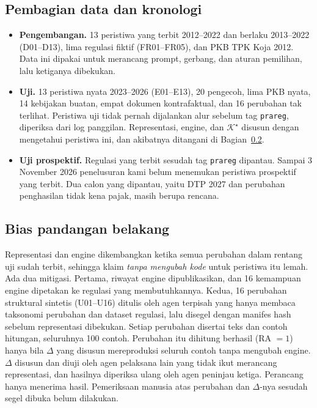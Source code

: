 \documentclass[conference]{IEEEtran}
\makeatletter
\DeclareRobustCommand{\en}[1]{{\usefont{\f@encoding}{\f@family}{\f@series}{it}#1\/}}
\newcommand{\K}{\mathcal{K}}
\newcommand{\emas}{\star}
\makeatother
\begin{document}
\subsection{Pembagian data dan kronologi}
\label{subsec:pembagian}
\begin{itemize}[leftmargin=*,nosep]
  \item \textbf{Pengembangan.} 13 peristiwa yang terbit 2012--2022 dan berlaku 2013--2022 (D01--D13), lima regulasi fiktif (FR01--FR05), dan PKB TPK Koja 2012. Data ini dipakai untuk merancang \en{prompt}, gerbang, dan aturan pemilihan, lalu ketiganya dibekukan.
  \item \textbf{Uji.} 13 peristiwa nyata 2023--2026 (E01--E13), 20 pengecoh, lima PKB nyata, 14 kebijakan buatan, empat dokumen kontrafaktual, dan 16 perubahan tak terlihat. Peristiwa uji tidak pernah dijalankan alur sebelum \en{tag} \texttt{prareg}, diperiksa dari log panggilan. Representasi, \en{engine}, dan $\K^{\emas}$ disusun dengan mengetahui peristiwa ini, dan akibatnya ditangani di Bagian~\ref{subsec:hindsight}.
  \item \textbf{Uji prospektif.} Regulasi yang terbit sesudah \en{tag} \texttt{prareg} dipantau. Sampai 3 November 2026 penelusuran kami belum menemukan peristiwa prospektif yang terbit. Dua calon yang dipantau, yaitu DTP 2027 dan perubahan penghasilan tidak kena pajak, masih berupa rencana.
\end{itemize}

\subsection{Bias pandangan belakang}
\label{subsec:hindsight}
Representasi dan \en{engine} dikembangkan ketika semua perubahan dalam rentang uji sudah terbit, sehingga klaim \emph{tanpa mengubah kode} untuk peristiwa itu lemah. Ada dua mitigasi. Pertama, riwayat \en{engine} dipublikasikan, dan 16 kemampuan \en{engine} dipetakan ke regulasi yang membutuhkannya. Kedua, 16 perubahan struktural sintetis (U01--U16) ditulis oleh agen terpisah yang hanya membaca taksonomi perubahan dan \en{dataset} regulasi, lalu disegel dengan manifes \en{hash} sebelum representasi dibekukan. Setiap perubahan disertai teks dan contoh hitungan, seluruhnya 100 contoh. Perubahan itu dihitung berhasil (RA $=1$) hanya bila $\Delta$ yang disusun mereproduksi seluruh contoh tanpa mengubah \en{engine}. $\Delta$ disusun dan diuji oleh agen pelaksana lain yang tidak ikut merancang representasi, dan hasilnya diperiksa ulang oleh agen peninjau ketiga. Perancang hanya menerima hasil. Pemeriksaan manusia atas perubahan dan $\Delta$-nya sesudah segel dibuka belum dilakukan.
\end{document}
